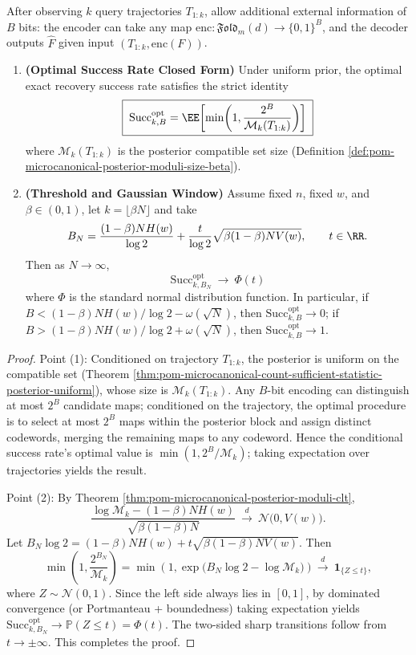 \begin{theorem}\label{thm:pom-microcanonical-query-plus-bits-phase}
After observing \(k\) query trajectories \(T_{1:k}\), allow additional external information of \(B\) bits:
the encoder can take any map \(\mathrm{enc}:\mathfrak{Fold}_m(d)\to\{0,1\}^B\), and the decoder outputs \(\widehat F\) given input \((T_{1:k},\mathrm{enc}(F))\).
\begin{enumerate}
  \item \textbf{(Optimal Success Rate Closed Form)} Under uniform prior, the optimal exact recovery success rate satisfies the strict identity
  \[
  \boxed{\;
  \mathrm{Succ}^{\mathrm{opt}}_{k,B}
  =\EE\!\left[\min\!\left(1,\frac{2^B}{\mathcal{M}_k(T_{1:k})}\right)\right]\;}
  \]
  where \(\mathcal{M}_k(T_{1:k})\) is the posterior compatible set size (Definition \ref{def:pom-microcanonical-posterior-moduli-size-beta}).
  \item \textbf{(Threshold and Gaussian Window)}
  Assume fixed \(n\), fixed \(w\), and \(\beta\in(0,1)\), let \(k=\lfloor\beta N\rfloor\) and take
  \[
  B_N=\frac{(1-\beta)NH(w)}{\log 2}
  +\frac{t}{\log 2}\sqrt{\beta(1-\beta)N V(w)},
  \qquad t\in\RR.
  \]
  Then as \(N\to\infty\),
  \[
  \boxed{\;
  \mathrm{Succ}^{\mathrm{opt}}_{k,B_N}\ \longrightarrow\ \Phi(t)\;}
  \]
  where \(\Phi\) is the standard normal distribution function.
  In particular, if \(B<(1-\beta)NH(w)/\log 2-\omega(\sqrt N)\), then \(\mathrm{Succ}^{\mathrm{opt}}_{k,B}\to 0\);
  if \(B>(1-\beta)NH(w)/\log 2+\omega(\sqrt N)\), then \(\mathrm{Succ}^{\mathrm{opt}}_{k,B}\to 1\).
\end{enumerate}
\end{theorem}
\begin{proof}
Point (1): Conditioned on trajectory \(T_{1:k}\), the posterior is uniform on the compatible set (Theorem \ref{thm:pom-microcanonical-count-sufficient-statistic-posterior-uniform}), whose size is \(\mathcal{M}_k(T_{1:k})\).
Any \(B\)-bit encoding can distinguish at most \(2^B\) candidate maps; conditioned on the trajectory, the optimal procedure is to select at most \(2^B\) maps within the posterior block and assign distinct codewords, merging the remaining maps to any codeword.
Hence the conditional success rate's optimal value is \(\min(1,2^B/\mathcal{M}_k)\); taking expectation over trajectories yields the result.
\par
Point (2): By Theorem \ref{thm:pom-microcanonical-posterior-moduli-clt},
\[
\frac{\log \mathcal{M}_k-(1-\beta)NH(w)}{\sqrt{\beta(1-\beta)N}}
\ \xrightarrow{d}\ \mathcal N\bigl(0,V(w)\bigr).
\]
Let \(B_N\log 2=(1-\beta)NH(w)+t\sqrt{\beta(1-\beta)NV(w)}\).
Then
\[
\min\!\left(1,\frac{2^{B_N}}{\mathcal{M}_k}\right)
=\min\!\left(1,\exp\!\bigl(B_N\log 2-\log\mathcal{M}_k\bigr)\right)
\xrightarrow{d}\ \mathbf{1}_{\{Z\le t\}},
\]
where \(Z\sim\mathcal N(0,1)\).
Since the left side always lies in \([0,1]\), by dominated convergence (or Portmanteau + boundedness) taking expectation yields
\(
\mathrm{Succ}^{\mathrm{opt}}_{k,B_N}\to \mathbb{P}(Z\le t)=\Phi(t)
\).
The two-sided sharp transitions follow from \(t\to\pm\infty\). This completes the proof.
\end{proof}
